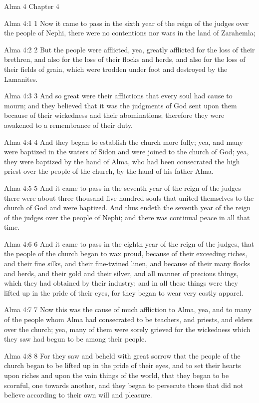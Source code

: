 Alma 4
Chapter 4

Alma 4:1
 1 Now it came to pass in the sixth year of the reign of the
judges over the people of Nephi, there were no contentions nor
wars in the land of Zarahemla;

Alma 4:2
 2 But the people were afflicted, yea, greatly afflicted for the
loss of their brethren, and also for the loss of their flocks and
herds, and also for the loss of their fields of grain, which were
trodden under foot and destroyed by the Lamanites.

Alma 4:3
 3 And so great were their afflictions that every soul had cause
to mourn; and they believed that it was the judgments of God sent
upon them because of their wickedness and their abominations;
therefore they were awakened to a remembrance of their duty.

Alma 4:4
 4 And they began to establish the church more fully; yea, and
many were baptized in the waters of Sidon and were joined to the
church of God; yea, they were baptized by the hand of Alma, who
had been consecrated the high priest over the people of the
church, by the hand of his father Alma.

Alma 4:5
 5 And it came to pass in the seventh year of the reign of the
judges there were about three thousand five hundred souls that
united themselves to the church of God and were baptized. And
thus endeth the seventh year of the reign of the judges over the
people of Nephi; and there was continual peace in all that time.

Alma 4:6
 6 And it came to pass in the eighth year of the reign of the
judges, that the people of the church began to wax proud, because
of their exceeding riches, and their fine silks, and their
fine-twined linen, and because of their many flocks and herds,
and their gold and their silver, and all manner of precious
things, which they had obtained by their industry; and in all
these things were they lifted up in the pride of their eyes, for
they began to wear very costly apparel.

Alma 4:7
 7 Now this was the cause of much affliction to Alma, yea, and to
many of the people whom Alma had consecrated to be teachers, and
priests, and elders over the church; yea, many of them were
sorely grieved for the wickedness which they saw had begun to be
among their people.

Alma 4:8
 8 For they saw and beheld with great sorrow that the people of
the church began to be lifted up in the pride of their eyes, and
to set their hearts upon riches and upon the vain things of the
world, that they began to be scornful, one towards another, and
they began to persecute those that did not believe according to
their own will and pleasure.

